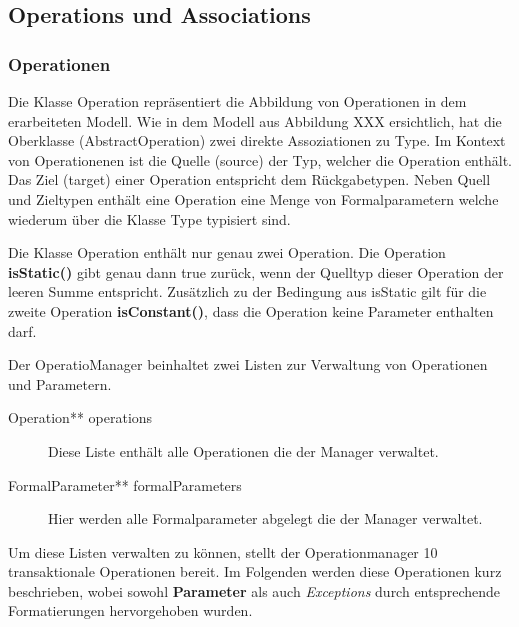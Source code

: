 \subsection{Operations und Associations}

\subsubsection{Operationen}

Die Klasse Operation repräsentiert die Abbildung von Operationen in dem erarbeiteten Modell.
Wie in dem Modell aus Abbildung XXX ersichtlich, hat die Oberklasse (AbstractOperation) zwei direkte Assoziationen zu Type. 
Im Kontext von Operationenen ist die Quelle (source) der Typ, welcher die Operation enthält. 
Das Ziel (target) einer Operation entspricht dem Rückgabetypen.
Neben Quell und Zieltypen enthält eine Operation eine Menge von Formalparametern welche 
wiederum über die Klasse Type typisiert sind.

Die Klasse Operation enthält nur genau zwei Operation.
Die Operation \textbf{isStatic()} gibt genau dann true zurück, wenn der Quelltyp dieser Operation der leeren Summe entspricht.
Zusätzlich zu der Bedingung aus isStatic gilt für die zweite Operation \textbf{isConstant()}, dass die Operation keine Parameter enthalten darf. 


 \newline
Der OperatioManager beinhaltet zwei Listen zur Verwaltung von Operationen und Parametern.

\begin{description}
\item[Operation** operations] Diese Liste enthält alle Operationen die der Manager verwaltet.
\item[FormalParameter** formalParameters] Hier werden alle Formalparameter abgelegt die der Manager verwaltet.
\end{description}

Um diese Listen verwalten zu können, stellt der Operationmanager 10 transaktionale Operationen bereit.
Im Folgenden werden diese Operationen kurz beschrieben, wobei sowohl \textbf{Parameter} als auch \emph{Exceptions} durch entsprechende Formatierungen hervorgehoben wurden.

